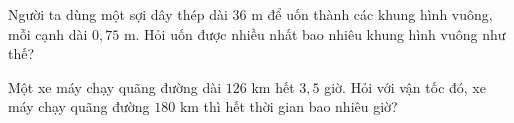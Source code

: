 \begin{ex} %
Người ta dùng một sợi dây thép dài $36\text{ m}$ để uốn thành các khung hình vuông, mỗi cạnh dài $0{,}75\text{ m}$. Hỏi uốn được nhiều nhất bao nhiêu khung hình vuông như thế?
\end{ex}

\begin{ex} %
Một xe máy chạy quãng đường dài $126\text{ km}$ hết $3{,}5$ giờ. Hỏi với vận tốc đó, xe máy chạy quãng đường $180\text{ km}$ thì hết thời gian bao nhiêu giờ?
\end{ex}
